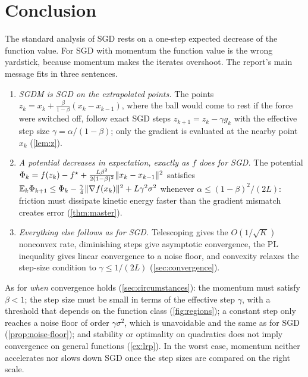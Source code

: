 \section{Conclusion}\label{sec:conclusion}

The standard analysis of SGD rests on a one-step expected decrease of the function value.
For SGD with momentum the function value is the wrong yardstick, because momentum makes
the iterates overshoot. The report's main message fits in three sentences.

\begin{enumerate}
\item \emph{SGDM is SGD on the extrapolated points.} The points
  $z_k=x_k+\frac{\beta}{1-\beta}(x_k-x_{k-1})$, where the ball would come to rest if the
  force were switched off, follow exact SGD steps $z_{k+1}=z_k-\gamma g_k$ with the effective
  step size $\gamma=\alpha/(1-\beta)$; only the gradient is evaluated at the nearby point $x_k$
  (\cref{lem:z}).
\item \emph{A potential decreases in expectation, exactly as $f$ does for SGD.} The
  potential $\Phi_k=f(z_k)-f^\star+\frac{L\beta^2}{2(1-\beta)^2}\lVert x_k-x_{k-1}\rVert^2$ satisfies
  $\mathbb{E}_k\Phi_{k+1}\le\Phi_k-\frac\gamma4\lVert \nabla f(x_k)\rVert^2+L\gamma^2\sigma^2$ whenever
  $\alpha\le(1-\beta)^2/(2L)$: friction must dissipate kinetic energy faster than the gradient
  mismatch creates error (\cref{thm:master}).
\item \emph{Everything else follows as for SGD.} Telescoping gives the $O(1/\sqrt K)$
  nonconvex rate, diminishing steps give asymptotic convergence, the PL inequality gives
  linear convergence to a noise floor, and convexity relaxes the step-size condition to
  $\gamma\le1/(2L)$ (\cref{sec:convergence}).
\end{enumerate}

As for \emph{when} convergence holds (\cref{sec:circumstances}): the momentum must satisfy
$\beta<1$; the step size must be small in terms of the effective step $\gamma$, with a
threshold that depends on the function class (\cref{fig:regions}); a constant step only
reaches a noise floor of order $\gamma\sigma^2$, which is unavoidable and the same as for SGD
(\cref{prop:noise-floor}); and stability or optimality on quadratics does not imply
convergence on general functions (\cref{ex:lrp}). In the worst case, momentum neither
accelerates nor slows down SGD once the step sizes are compared on the right scale.
